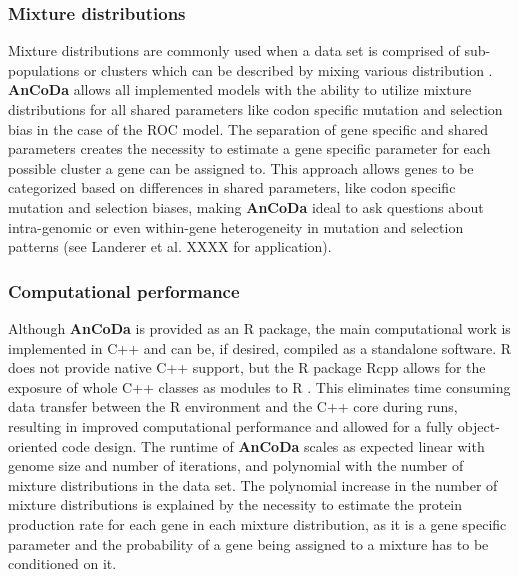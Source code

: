 \documentclass{bioinfo}
\newcommand{\package}{\textbf{AnCoDa }} %
\begin{document}
\subsubsection*{Mixture distributions}
Mixture distributions are commonly used when a data set is comprised of sub-populations or clusters which can be described by mixing various distribution \citep{gelman2013}. 
\package allows all implemented models with the ability to utilize mixture distributions for all shared parameters like codon specific mutation and selection bias in the case of the ROC model. 
The separation of gene specific and shared parameters creates the necessity to estimate a gene specific parameter for each possible cluster a gene can be assigned to. 
This approach allows genes to be categorized based on differences in shared parameters, like codon specific mutation and selection biases, making \package ideal to ask questions about intra-genomic or even within-gene heterogeneity in mutation and selection patterns (see Landerer et al. XXXX for application). 

\subsubsection*{Computational performance}
Although \package is provided as an R package, the main computational work is implemented in C++ and can be, if desired, compiled as a standalone software.
R does not provide native C++ support, but the R package Rcpp allows for the exposure of whole C++ classes as modules to R \citep{rcpp_package}.
This eliminates time consuming data transfer between the R environment and the C++ core during runs, resulting in improved computational performance and allowed for a fully object-oriented code design. 
The runtime of \package scales as expected linear with genome size and number of iterations, and polynomial with the number of mixture distributions in the data set. The polynomial increase in the number of mixture distributions is explained by the necessity to estimate the protein production rate for each gene in each mixture distribution, as it is a gene specific parameter and the probability of a gene being assigned to a mixture has to be conditioned on it.  



\end{document}
